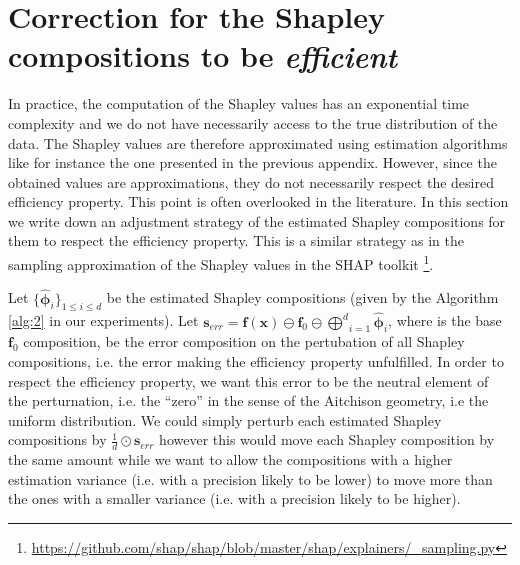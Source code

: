 \documentclass{article}
\theoremstyle{plain}
\theoremstyle{definition}
\theoremstyle{remark}
\begin{document}
\section{Correction for the Shapley compositions to be \emph{efficient}}
\label{app:correct}

In practice, the computation of the Shapley values has an exponential time complexity and we do not have necessarily access to the true distribution of the data. The Shapley values are therefore approximated using estimation algorithms like for instance the one presented in the previous appendix. However, since the obtained values are approximations, they do not necessarily respect the desired efficiency property. This point is often overlooked in the literature. In this section we write down an adjustment strategy of the estimated Shapley compositions for them to respect the efficiency property. This is a similar strategy as in the sampling approximation of the Shapley values in the SHAP toolkit \cite{NIPS2017_7062}\footnote{\url{https://github.com/shap/shap/blob/master/shap/explainers/_sampling.py}}.

Let $\{\hat{\bm{\phi}}_i\}_{1\leq i \leq d}$ be the estimated Shapley compositions (given by the Algorithm \ref{alg:2} in our experiments). Let $\displaystyle \bm{s}_{err} = \bm{f}(\bm{x}) \ominus \bm{f}_0 \ominus \underset{i=1}{\overset{d}\bigoplus} \hat{\bm{\phi}}_i$, where is the base $\bm{f}_0$ composition, be the error composition on the pertubation of all Shapley compositions, i.e. the error making the efficiency property unfulfilled. In order to respect the efficiency property, we want this error to be the neutral element of the perturnation, i.e. the ``zero'' in the sense of the Aitchison geometry, i.e the uniform distribution. We could simply perturb each estimated Shapley compositions by $\frac{1}{d}\odot\bm{s}_{err}$ however this would move each Shapley composition by the same amount while we want to allow the compositions with a higher estimation variance (i.e. with a precision likely to be lower) to move more than the ones with a smaller variance (i.e. with a precision likely to be higher).
\end{document}
